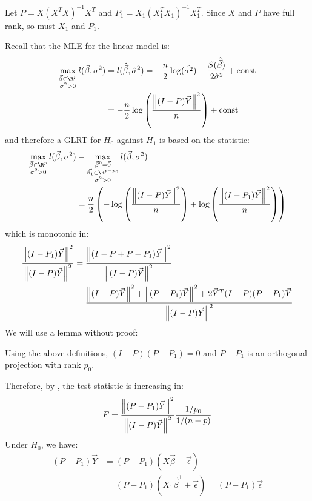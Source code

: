 \documentclass[../Main.tex]{subfiles}
\begin{document}
Let $P = X(X^TX)^{-1}X^T$ and $P_1 = X_1(X_1^TX_1)^{-1}X_1^T$. Since $X$ and $P$ have full rank, so must $X_1$ and $P_1$.

Recall that the MLE for the linear model is:
\begin{align*}
    \max_{\substack{\vec{\beta} \in \R^p\\\sigma^2 > 0}}l(\vec{\beta}, \sigma^2) &= l(\hat{\vec{\beta}}, \hat{\sigma}^2) = -\frac{n}{2} \log(\hat{\sigma^2}) - \frac{S(\hat{\vec{\beta}})}{2\hat{\sigma}^2} + \text{const} \\
    &= -\frac{n}{2} \log\left(\frac{\norm{(I-P)\vec{Y}}^2}{n}\right) + \text{const}
\end{align*}
and therefore a GLRT for $H_0$ against $H_1$ is based on the statistic:
\begin{align*}
    \max_{\substack{\vec{\beta} \in \R^p\\\sigma^2 > 0}}l(\vec{\beta}, \sigma^2)& - \max_{\substack{\vec{\beta}^0 = \vec0\\\vec{\beta_1} \in \R^{p-p_0}\\\sigma^2 > 0}}l(\vec{\beta}, \sigma^2) \\
    &= \frac{n}{2} \left(-\log\left(\frac{\norm{(I - P)\vec{Y}}^2}{n}\right) + \log\left(\frac{\norm{(I - P_1)\vec{Y}}^2}{n}\right)\right)
\end{align*}
which is monotonic in:
\begin{align*}
    \frac{\left\|(I - P_1)\vec{Y}\right\|^2}{\left\|(I - P)\vec{Y}\right\|^2}&= \frac{\left\|(I - P + P - P_1)\vec{Y}\right\|^2}{\left\|(I - P)\vec{Y}\right\|^2} \\
    &= \frac{\left\|(I-P)\vec{Y}\right\|^2 + \left\|(P - P_1)\vec{Y}\right\|^2 + 2\vec{Y}^T (I-P)(P-P_1)\vec{Y}}{\left\|(I - P)\vec{Y}\right\|^2}
\end{align*}
We will use a lemma without proof:
\begin{lemma}
    Using the above definitions, $(I - P)(P - P_1) = 0$ and $P-P_1$ is an orthogonal projection with rank $p_0$.
    \label{lemProjectionMatrices}
\end{lemma}
Therefore, by , the test statistic is increasing in:
\begin{equation*}
    F = \frac{\left\|(P - P_1)\vec{Y}\right\|^2}{\left\|(I - P)\vec{Y}\right\|^2} \frac{1 / p_0}{1 / (n - p)}
\end{equation*}
Under $H_0$, we have:
\begin{align*}
    (P - P_1) \vec{Y} &= (P - P_1)(X\vec{\beta} + \vec{\epsilon}) \\
    &= (P - P_1)(X_1 \vec{\beta}^1 + \vec{\epsilon}) = (P - P_1) \vec{\epsilon}
\end{align*}
\end{document}
